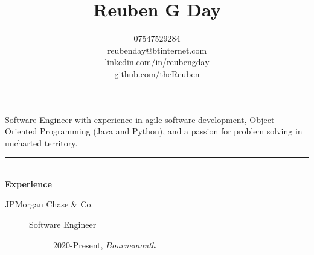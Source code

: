 \documentclass[12pt, a4paper]{article}
\date{}
\title{\vspace{-6ex}Reuben G Day }
\author{07547529284 \\ reubenday@btinternet.com \\ linkedin.com/in/reubengday \\ github.com/theReuben}
\begin{document}
\maketitle
\vspace{-5ex}

\begin{center}
  Software Engineer with experience in agile software development, Object-Oriented Programming (Java and Python), and a passion for problem solving in uncharted territory.
\end{center}

\vspace{-2ex}

\noindent\rule{8cm}{0.4pt} \\
\textbf{Experience}
\begin{description}
  \item[JPMorgan Chase $\&$ Co.]\textbf{}
  \begin{description}
    \item[Software Engineer] 2020-Present, \textit{Bournemouth}
    
  \end{description}
  
\end{description}

\vspace{-2ex}
\end{document}
